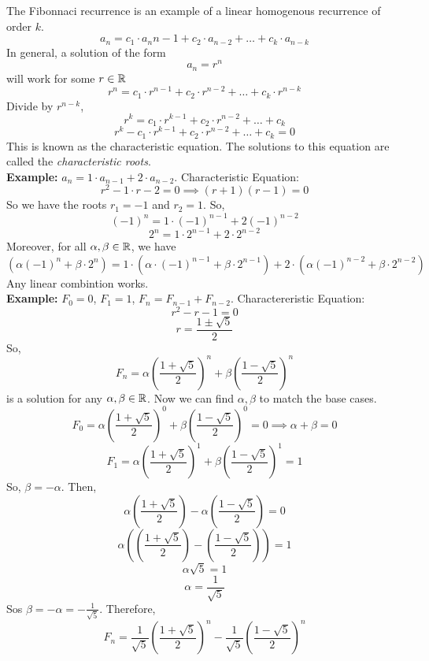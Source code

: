 \documentclass[openany]{report}
\begin{document}
The Fibonnaci recurrence is an example of a linear homogenous recurrence of order $k$.
\[a_n = c_1 \cdot a_n{n-1} + c_2 \cdot a_{n-2} + \ldots + c_k \cdot a_{n-k}\]
In general, a solution of the form 
\[a_n = r^n\]
will work for some $r \in \mathbb{R}$
\[r^n = c_1 \cdot r^{n-1} + c_2 \cdot r^{n-2} + \ldots + c_k\cdot r^{n-k}\]
Divide by $r^{n-k}$,
\[r^k = c_1\cdot r^{k-1} + c_2 \cdot r^{n-2} + \ldots + c_k\]
\[r^k - c_1\cdot r^{k-1} + c_2 \cdot r^{n-2} + \ldots + c_k = 0\]
This is known as the characteristic equation. The solutions to this equation are called the \emph{characteristic roots}.\\[2ex]
\textbf{Example:} $a_n = 1 \cdot a_{n-1} + 2\cdot a_{n-2}$.
Characteristic Equation: 
\[r^2 - 1\cdot r - 2 = 0 \implies (r+1)(r-1) = 0\]
So we have the roots $r_1 = -1$ and $r_2 = 1$. So, 
\[(-1)^n = 1 \cdot (-1)^{n-1} + 2(-1)^{n-2}\]
\[2^n = 1 \cdot 2^{n-1} + 2 \cdot 2^{n-2}\]
Moreover, for all $\alpha, \beta \in \mathbb{R}$, we have 
\[(\alpha(-1)^n + \beta\cdot 2^n) = 1\cdot \left(\alpha \cdot (-1)^{n-1} + \beta \cdot 2^{n-1}\right) + 2\cdot\left(\alpha(-1)^{n-2} + \beta \cdot 2^{n-2}\right)\]
Any linear combintion works. \\[2ex]
\textbf{Example:} $F_0 =0$, $F_1 = 1$, $F_n = F_{n-1} + F_{n-2}$.
Charactereristic Equation:
\[r^2 - r - 1 = 0\]
\[r = \frac{1 \pm \sqrt{5}}{2}\]
So, 
\[F_n = \alpha \left(\frac{1 + \sqrt{5}}{2}\right)^n + \beta \left(\frac{1 - \sqrt{5}}{2}\right)^n\]
is a solution for any $\alpha, \beta \in \mathbb{R}$. Now we can find $\alpha,\beta$ to match the base cases.
\[F_0 = \alpha \left(\frac{1 + \sqrt{5}}{2}\right)^0 + \beta \left(\frac{1 - \sqrt{5}}{2}\right)^0 = 0 \implies \alpha + \beta = 0\]
\[F_1 = \alpha \left(\frac{1 + \sqrt{5}}{2}\right)^1 + \beta \left(\frac{1 - \sqrt{5}}{2}\right)^1 = 1 \]
So, $\beta = -\alpha$. Then,
\[\alpha \left(\frac{1 + \sqrt{5}}{2}\right) - \alpha \left(\frac{1 - \sqrt{5}}{2}\right) = 0\]
\[\alpha \left(\left(\frac{1 + \sqrt{5}}{2}\right) - \left(\frac{1 - \sqrt{5}}{2}\right)\right) = 1\]
\[\alpha\sqrt{5} = 1\]
\[\alpha = \frac{1}{\sqrt{5}}\]
Sos $\beta = -\alpha = -\frac{1}{\sqrt{5}}$. Therefore,
\[F_n = \frac{1}{\sqrt{5}}\left(\frac{1 + \sqrt{5}}{2}\right)^n - \frac{1}{\sqrt{5}}\left(\frac{1 - \sqrt{5}}{2}\right)^n\]

\end{document}
